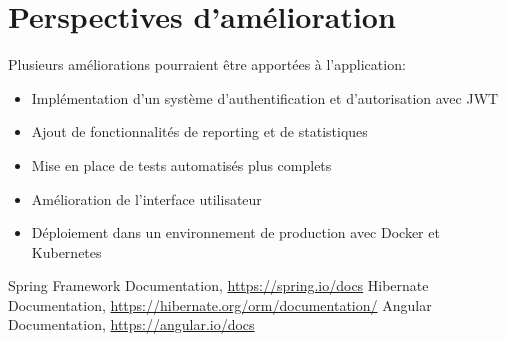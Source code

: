 \documentclass[12pt,a4paper]{report}
\begin{document}
\section{Perspectives d'amélioration}
Plusieurs améliorations pourraient être apportées à l'application:
\begin{itemize}
    \item Implémentation d'un système d'authentification et d'autorisation avec JWT
    \item Ajout de fonctionnalités de reporting et de statistiques
    \item Mise en place de tests automatisés plus complets
    \item Amélioration de l'interface utilisateur
    \item Déploiement dans un environnement de production avec Docker et Kubernetes
\end{itemize}

\begin{thebibliography}{9}
 Spring Framework Documentation, \url{https://spring.io/docs}
 Hibernate Documentation, \url{https://hibernate.org/orm/documentation/}
 Angular Documentation, \url{https://angular.io/docs}
\end{thebibliography}
\end{document}
